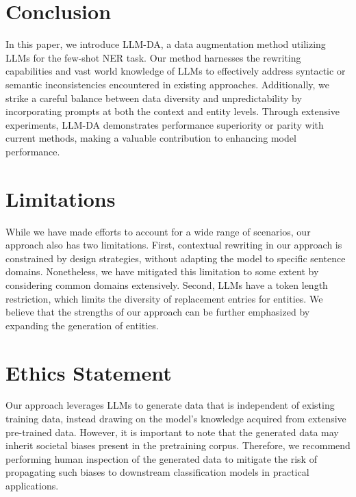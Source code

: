 \documentclass[11pt]{article}
\begin{document}
\section{Conclusion}
In this paper, we introduce LLM-DA, a data augmentation method utilizing LLMs for the few-shot NER task. Our method harnesses the rewriting capabilities and vast world knowledge of LLMs to effectively address syntactic or semantic inconsistencies encountered in existing approaches. Additionally, we strike a careful balance between data diversity and unpredictability by incorporating prompts at both the context and entity levels. Through extensive experiments, LLM-DA demonstrates performance superiority or parity with current methods, making a valuable contribution to enhancing model performance.


\section*{Limitations}
While we have made efforts to account for a wide range of scenarios, our approach also has two limitations. First, contextual rewriting in our approach is constrained by design strategies, without adapting the model to specific sentence domains. Nonetheless, we have mitigated this limitation to some extent by considering common domains extensively. Second, LLMs have a token length restriction, which limits the diversity of replacement entries for entities. We believe that the strengths of our approach can be further emphasized by expanding the generation of entities.


\section*{Ethics Statement}
Our approach leverages LLMs to generate data that is independent of existing training data, instead drawing on the model's knowledge acquired from extensive pre-trained data. However, it is important to note that the generated data may inherit societal biases present in the pretraining corpus. Therefore, we recommend performing human inspection of the generated data to mitigate the risk of propagating such biases to downstream classification models in practical applications.


%


\appendix
\end{document}
